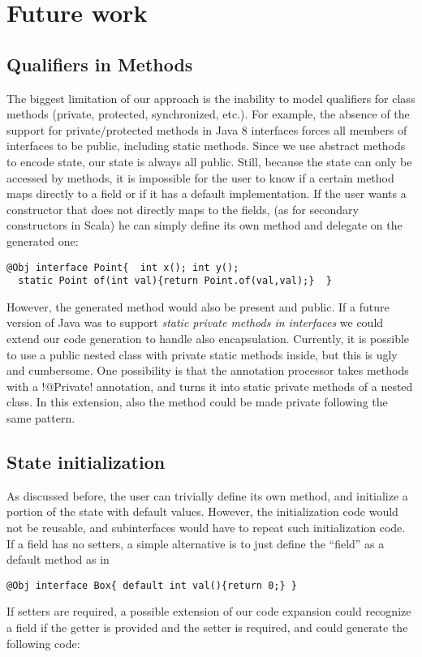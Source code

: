 \section{Future work}\label{sec:futurework}

\subsection{Qualifiers in Methods} %
The biggest limitation of our approach is the inability to model qualifiers
for class methods (private, protected, synchronized, etc.). For example, the absence
of the support for private/protected methods in Java 8 interfaces forces all
members of interfaces to be public, including static methods. Since we use
abstract methods to encode state, our state is always all public. Still, because 
the state can only be accessed by methods, it 
is impossible for the user to know if a certain method maps directly to a field
or if it has a default implementation.  If the user wants a constructor that
does not directly maps to the fields, (as for secondary constructors in Scala)
he can simply define its own \Q@of@ method and delegate on the generated one:
\begin{lstlisting}
@Obj interface Point{  int x(); int y();
  static Point of(int val){return Point.of(val,val);}  }
\end{lstlisting}
However, the generated \Q@of@ method would also be present and public.  If a
future version of Java was to support \emph{static private methods in
  interfaces} we could extend our code generation to handle also encapsulation.
Currently, it is possible to use a public nested class with private static
methods inside, but this is ugly and cumbersome. One possibility is that the
annotation processor takes methods with a \Q!@Private! annotation, and turns it into
static private methods of a nested class. In this extension, also the \Q@of@
method could be made private following the same pattern.

\subsection{State initialization}
As discussed before, the user can trivially define its own \Q@of@ method, and
initialize a portion of the state with default values.  However, the
initialization code would not be reusable, and subinterfaces would have
to repeat such initialization code.  If a field has no setters, a simple
alternative is to just define the ``field'' as a default method as in
\begin{lstlisting}
@Obj interface Box{ default int val(){return 0;} }
\end{lstlisting}
If setters are required, a possible extension of our code expansion could
recognize a field if the getter is provided and the setter is required, and
could generate the following code:

